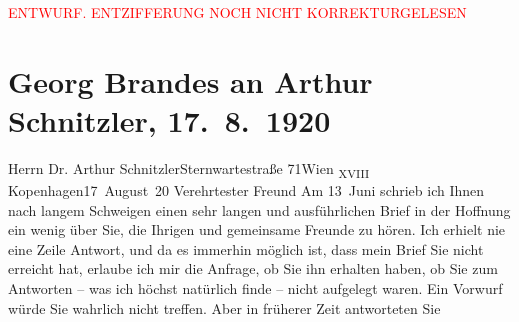 
\begin{center}
            \textcolor{red}{ENTWURF. ENTZIFFERUNG NOCH NICHT KORREKTURGELESEN}
                      \end{center}
            
               \section[Georg Brandes an Arthur Schnitzler, 17. 8. 1920]{ Georg Brandes an Arthur Schnitzler, 17. 8. 1920}\nopagebreak{}\rehead{ }\begin{ledgroupsized}[t]{13cm}\normalsize\beginnumbering{} \toendnotes[C]{\smallbreak\pagebreak[2]} 
\toendnotes[C]{\smallbreak}\pstart{}{\pb}Herrn Dr. Arthur
                  Schnitzler\pend{}\pstart{}Sternwartestraße 71\pend{}\pstart{}Wien \textsubscript{XVIII}\pend{}{\bigskip}\pstart
           \raggedleft{}{\pb}Kopenhagen17 August 20\pend
           \pstart{}Verehrtester Freund\pend\pstart
           Am 13 Juni schrieb ich Ihnen nach langem Schweigen einen sehr langen und
               ausführlichen Brief in der Hoffnung ein wenig über Sie, die Ihrigen und gemeinsame
               Freunde zu hören.\pend
           \pstart
           Ich erhielt nie eine Zeile Antwort, und da es immerhin möglich ist, dass mein Brief
               Sie nicht erreicht hat, erlaube ich mir die Anfrage, ob Sie ihn erhalten haben, ob
               Sie zum Antworten – was ich höchst natürlich finde – nicht aufgelegt waren. Ein
               Vorwurf würde Sie wahrlich nicht treffen. Aber in früherer Zeit antworteten Sie

\end{ledgroupsized}
